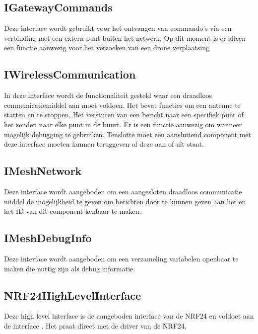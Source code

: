 \documentclass[a4paper, 11pt, oneside]{report}
\begin{document}
\subsection{IGatewayCommands}
\label{architectural:interfaces:IGatewayCommands}
Deze interface wordt gebruikt voor het ontvangen van commando's via een verbinding met een extern punt buiten het netwerk. Op dit moment is er alleen een functie aanwezig voor het verzoeken van een drone verplaatsing
\subsection{IWirelessCommunication}
\label{architectural:interfaces:IWirelessCommunication}
In deze interface wordt de functionaliteit gesteld waar een draadloos communicatiemiddel aan moet voldoen. Het bevat functies om een antenne te starten en te stoppen. Het versturen van een bericht naar een specifiek punt of het zenden naar elke punt in de buurt. Er is een functie aanwezig om wanneer mogelijk debugging te gebruiken. Tenslotte moet een aansluitend component met deze interface moeten kunnen teruggeven of deze aan of uit staat.

\subsection{IMeshNetwork}
\label{architectural:interfaces:IMeshNetwork}
Deze interface wordt aangeboden om een aangesloten draadloos communicatie middel de mogelijkheid te geven om berichten door te kunnen geven aan het  en het ID van dit component kenbaar te maken.

\subsection{IMeshDebugInfo}
\label{architectural:interfaces:IMeshDebugInfo}
Deze interface wordt aangeboden om een verzameling variabelen openbaar te maken die nuttig zijn als debug informatie.

\subsection{NRF24HighLevelInterface}
\label{architectural:interfaces:NRF24HighLevelInterface}

Deze high level interface is de aangeboden interface van de NRF24 en voldoet aan de interface . Het praat direct met de driver van de NRF24.  
\end{document}
